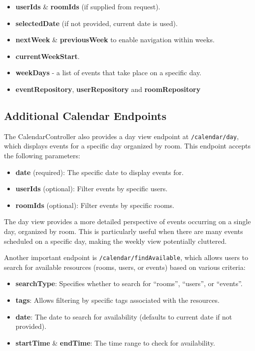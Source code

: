 \begin{itemize}
    \item \textbf{userIds} \& \textbf{roomIds} (if supplied from request).
    \item \textbf{selectedDate} (if not provided, current date is used).
    \item \textbf{nextWeek} \& \textbf{previousWeek} to enable navigation within weeks.
    \item \textbf{currentWeekStart}.
    \item \textbf{weekDays} - a list of events that take place on a specific day.
    \item \textbf{eventRepository}, \textbf{userRepository} and \textbf{roomRepository}
\end{itemize}

\subsection{Additional Calendar Endpoints}\label{subsec:additional-calendar-endpoints}

The CalendarController also provides a day view endpoint at \texttt{/calendar/day}, which displays events for a specific day organized by room.
This endpoint accepts the following parameters:

\begin{itemize}
    \item \textbf{date} (required): The specific date to display events for.
    \item \textbf{userIds} (optional): Filter events by specific users.
    \item \textbf{roomIds} (optional): Filter events by specific rooms.
\end{itemize}

The day view provides a more detailed perspective of events occurring on a single day, organized by room.
This is particularly useful when there are many events scheduled on a specific day, making the weekly view potentially cluttered.

Another important endpoint is \texttt{/calendar/findAvailable}, which allows users to search for available resources (rooms, users, or events) based on various criteria:

\begin{itemize}
    \item \textbf{searchType}: Specifies whether to search for ``rooms'', ``users'', or ``events''.
    \item \textbf{tags}: Allows filtering by specific tags associated with the resources.
    \item \textbf{date}: The date to search for availability (defaults to current date if not provided).
    \item \textbf{startTime} \& \textbf{endTime}: The time range to check for availability.
\end{itemize}

